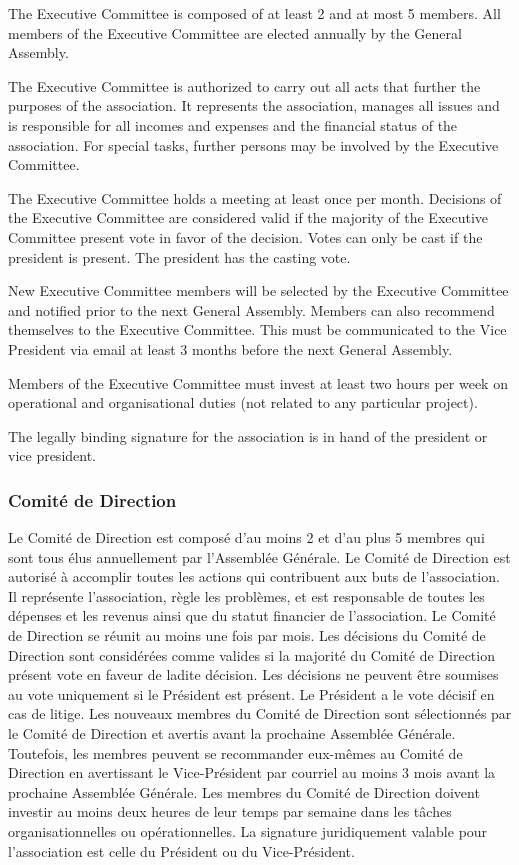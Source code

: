 \documentclass[12pt,a4paper,oneside]{article}
\newcounter{art}
\newcommand{\french}{    \switchcolumn[1]\noindent}
\begin{document}
\begin{paracol}{2}
	The Executive Committee is composed of at least 2 and at most 5 members. 
	All members of the Executive Committee are elected annually by the General Assembly.

	The Executive Committee is authorized to carry out all acts that further the purposes of the association. It represents the association, manages all issues and is responsible for all incomes and expenses and the financial status of the association. For special tasks, further persons may be involved by the Executive Committee. 

	The Executive Committee holds a meeting at least once per month. 
	Decisions of the Executive Committee are considered valid if the majority of the Executive Committee present vote in favor of the decision. Votes can only be cast if the president is present. The president has the casting vote.

	New Executive Committee members will be selected by the Executive Committee and notified prior to the next General Assembly. Members can also recommend themselves to the Executive Committee. This must be communicated to the Vice President via email at least 3 months before the next General Assembly.

	Members of the Executive Committee must invest at least two hours per week on operational and organisational duties (not related to any particular project).

	The legally binding signature for the association is in hand of the president or vice president.
 

	\french
	\subsubsection{Comité de Direction}
	Le Comité de Direction est composé d’au moins 2 et d’au plus 5 membres qui sont tous élus annuellement par l’Assemblée Générale. Le Comité de Direction est autorisé à accomplir toutes les actions qui contribuent aux buts de l’association.	Il représente l’association, règle les problèmes, et est responsable de toutes les dépenses et les revenus ainsi que du statut financier de l’association.
	Le Comité de Direction se réunit au moins une fois par mois. Les décisions du Comité de Direction sont considérées comme valides si la majorité du Comité de Direction présent vote en faveur de ladite décision. Les décisions ne peuvent être soumises au vote uniquement si le Président est présent. Le Président a le vote décisif en cas de litige.
	Les nouveaux membres du Comité de Direction sont sélectionnés par le Comité de Direction et avertis avant la prochaine Assemblée Générale. Toutefois, les membres peuvent se recommander eux-mêmes au Comité de Direction en avertissant le Vice-Président par courriel au moins 3 mois avant la prochaine Assemblée Générale.
	Les membres du Comité de Direction doivent investir au moins deux heures de leur temps par semaine dans les tâches organisationnelles ou opérationnelles. La signature juridiquement valable pour l’association est celle du Président ou du Vice-Président.


\end{paracol}
\end{document}

